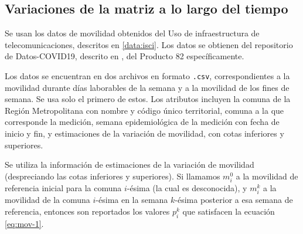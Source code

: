 


\subsection{Variaciones de la matriz a lo largo del tiempo} \label{subsec:variaciones}

Se usan los datos de movilidad obtenidos del Uso de infraestructura de telecomunicaciones, descritos en \ref{data:isci}. Los datos se obtienen del repositorio de Datos-COVID19, descrito en \label{sec:datos-minsal}, del Producto 82 específicamente. 


Los datos se encuentran en dos archivos en formato \texttt{.csv}, correspondientes a la movilidad durante días laborables de la semana y a la movilidad de los fines de semana. Se usa solo el primero de estos. Los atributos incluyen la comuna de la Región Metropolitana con nombre y código único territorial, comuna a la que corresponde la medición, semana epidemiológica de la medición con fecha de inicio y fin, y estimaciones de la variación de movilidad, con cotas inferiores y superiores.

Se utiliza la información de estimaciones de la variación de movilidad (despreciando las cotas inferiores y superiores). Si llamamos \(m_i^0\) a la movilidad de referencia inicial para la comuna \(i\)-ésima (la cual es desconocida), y \(m_i^k\) a la movilidad de la comuna \(i\)-ésima en la semana \(k\)-ésima posterior a esa semana de referencia, entonces son reportados los valores \(p_i^k\) que satisfacen la ecuación \ref{eq:mov-1}.

